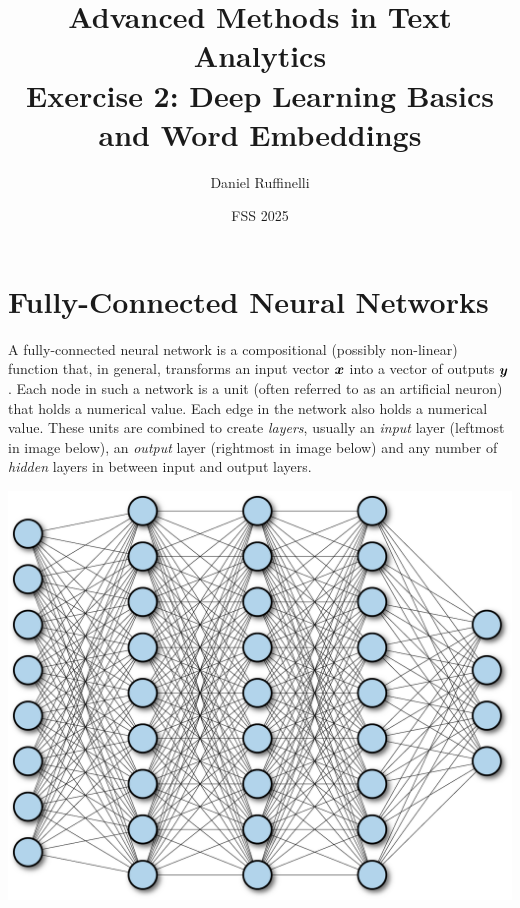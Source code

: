 \documentclass[11pt,a4paper]{article}
\title{Advanced Methods in Text Analytics \\ 
Exercise 2: Deep Learning Basics and Word Embeddings}
\author{Daniel Ruffinelli}
\date{FSS 2025}
\begin{document}
\maketitle

\section{Fully-Connected Neural Networks}

A fully-connected neural network is a compositional (possibly non-linear)
function that, in general, transforms an input vector ${\boldsymbol{x}}$ into a vector of
outputs ${\boldsymbol{y}}$.
Each node in such a network is a unit (often referred to as an artificial
neuron) that holds a numerical value.
Each edge in the network also holds a numerical value.
These units are combined to create \emph{layers}, usually an \emph{input} layer
(leftmost in image below), an \emph{output} layer (rightmost in image below) and
any number of \emph{hidden} layers in between input and output layers.

\begin{center}
    \includegraphics[scale=0.7]{img/fnn_1.png}
\end{center}

\end{document}
